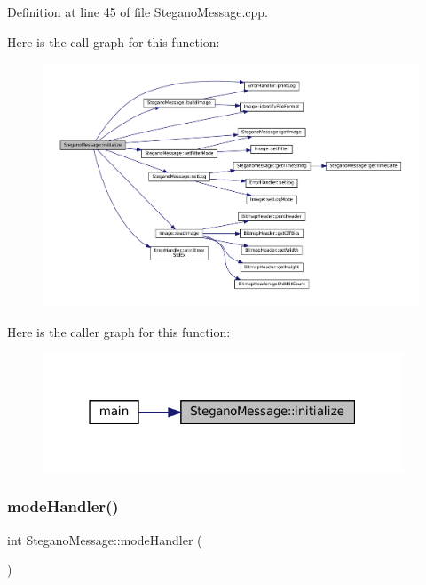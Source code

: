 Definition at line 45 of file Stegano\+Message.\+cpp.

Here is the call graph for this function\+:\nopagebreak
\begin{figure}[H]
\begin{center}
\leavevmode
\includegraphics[width=350pt]{classSteganoMessage_aeb4d2b69498c148508e2ca70194679cc_cgraph}
\end{center}
\end{figure}
Here is the caller graph for this function\+:\nopagebreak
\begin{figure}[H]
\begin{center}
\leavevmode
\includegraphics[width=304pt]{classSteganoMessage_aeb4d2b69498c148508e2ca70194679cc_icgraph}
\end{center}
\end{figure}
\mbox{\label{classSteganoMessage_a2649e515941e730520b759282d00dcd6}} 
\subsubsection{\texorpdfstring{modeHandler()}{modeHandler()}}
{\footnotesize\ttfamily int Stegano\+Message\+::mode\+Handler (\begin{DoxyParamCaption}{ }\end{DoxyParamCaption})}



